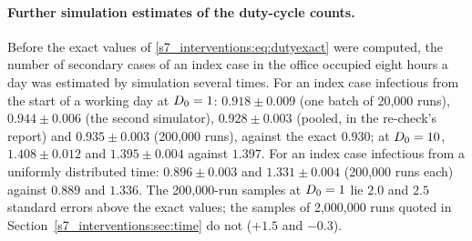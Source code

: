 \paragraph{Further simulation estimates of the duty-cycle counts.} Before the exact values of
\eqref{s7_interventions:eq:dutyexact} were computed, the number of secondary cases of an index case in the
office occupied eight hours a day was estimated by simulation several times. For an index case infectious
from the start of a working day at $D_0=1$: $0.918\pm0.009$ (one batch of 20,000 runs), $0.944\pm0.006$ (the
second simulator), $0.928\pm0.003$ (pooled, in the re-check's report) and $0.935\pm0.003$ (200,000
runs), against the exact $0.930$; at $D_0=10$, $1.408\pm0.012$ and $1.395\pm0.004$ against $1.397$. For an
index case infectious from a uniformly distributed time: $0.896\pm0.003$ and $1.331\pm0.004$ (200,000 runs
each) against $0.889$ and $1.336$. The 200,000-run samples at $D_0=1$ lie $2.0$ and $2.5$ standard errors
above the exact values; the samples of 2,000,000 runs quoted in Section~\ref{s7_interventions:sec:time} do
not ($+1.5$ and $-0.3$).

